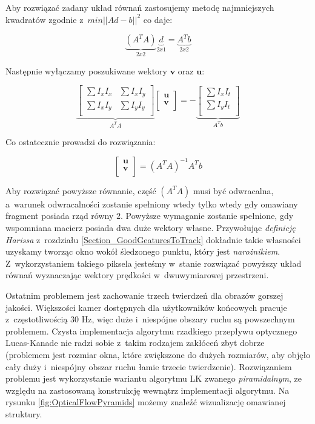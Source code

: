     Aby rozwiązać zadany układ równań zastosujemy metodę najmniejszych kwadratów zgodnie z~$min||Ad - b||^{2}$ co daje:

    \[
      \underbrace{(A^{T}A)}_{2x2} \underbrace{d}_{2x1} = \underbrace{A^{T}b}_{2x2}
    \]

    Następnie wyłączamy poszukiwane wektory $\mathbf{v}$ oraz $\mathbf{u}$:

    \[
      \underbrace{
        \begin{bmatrix}
          \sum I_{x} I_{x} & \sum I_{x} I_{y} \\
          \sum I_{x} I_{y} & \sum I_{y} I_{y} \\
        \end{bmatrix}
      }_{A^{T}A}
      \begin{bmatrix}
        \mathbf{u} \\
        \mathbf{v} \\
      \end{bmatrix} =
      -\underbrace{
        \begin{bmatrix}
          \sum I_{x} I_{t} \\
          \sum I_{y} I_{t} \\
        \end{bmatrix}
      }_{A^{T}b}
    \]

    Co ostatecznie prowadzi do rozwiązania:

    \[
      \begin{bmatrix}
        \mathbf{u} \\
        \mathbf{v} \\
      \end{bmatrix} = (A^{T}A)^{-1} A^{T}b
    \]

    Aby rozwiązać powyższe równanie, część $(A^{T}A)$ musi być odwracalna, a~warunek odwracalności zostanie spełniony wtedy tylko wtedy gdy omawiany fragment posiada rząd równy $2$. Powyższe wymaganie zostanie spełnione, gdy wspomniana macierz posiada dwa duże wektory własne. Przywołując \textit{definicję Harissa} z~rozdziału \ref{Section_GoodGeaturesToTrack} dokładnie takie własności uzyskamy tworząc okno wokół śledzonego punktu, który jest \textit{narożnikiem}. Z~wykorzystaniem takiego piksela jesteśmy w~stanie rozwiązać powyższy układ równań wyznaczając wektory prędkości w~dwuwymiarowej przestrzeni.

    Ostatnim problemem jest zachowanie trzech twierdzeń dla obrazów gorszej jakości. Większości kamer dostępnych dla użytkowników końcowych pracuje z~częstotliwością 30 Hz, więc duże i~niespójne obszary ruchu są powszechnym problemem. Czysta implementacja algorytmu rzadkiego przepływu optycznego Lucas-Kanade nie radzi sobie z~takim rodzajem zakłóceń zbyt dobrze (problemem jest rozmiar okna, które zwiększone do dużych rozmiarów, aby objęło cały duży i~niespójny obszar ruchu łamie trzecie twierdzenie). Rozwiązaniem problemu jest wykorzystanie wariantu algorytmu LK zwanego \textit{piramidalnym}, ze względu na zastosowaną konstrukcję wewnątrz implementacji algorytmu. Na rysunku \ref{fig:OpticalFlowPyramids} możemy znaleźć wizualizację omawianej struktury.

